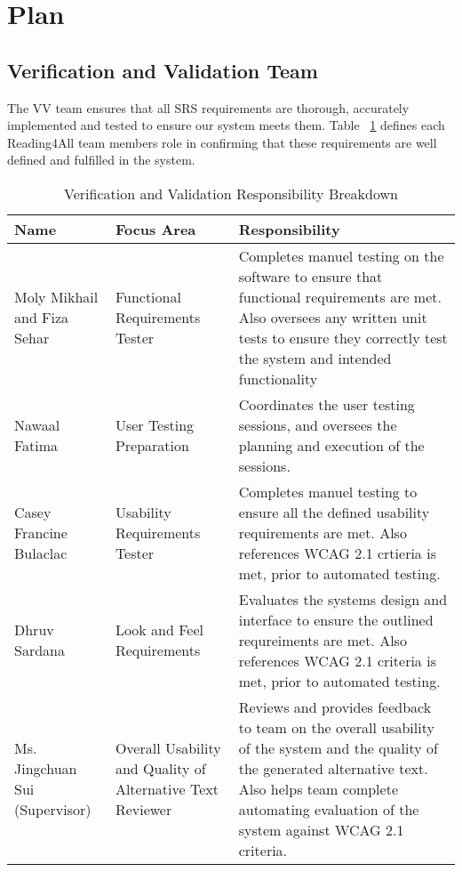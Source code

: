 \documentclass[12pt, titlepage]{article}
\begin{document}
\section{Plan}


\subsection{Verification and Validation Team}


The V\*V team ensures that all SRS requirements are thorough, accurately implemented and tested to ensure our system meets them. 
Table ~\ref{tab:data-dictionary-reading4all} defines each Reading4All team members role in confirming that these requirements are well defined and fulfilled in the system.

\begin{table}[H]
    \centering
    \caption{Verification and Validation Responsibility Breakdown}
    \label{tab:data-dictionary-reading4all}
    \begin{tabular}{ |p{3.0cm}|p{3.8cm}|p{7.3cm}| }
      \hline
      \textbf{Name} & \textbf{ Focus Area } & \textbf{Responsibility} \\
      \hline
      Moly Mikhail and Fiza Sehar & Functional Requirements Tester & Completes manuel testing on the software to ensure that functional requirements are met. Also oversees any written unit tests to ensure they correctly test the system and intended functionality \\
      \hline
      Nawaal Fatima & User Testing Preparation & Coordinates the user testing sessions, and oversees the planning and execution of the sessions. \\
      \hline 
      Casey Francine Bulaclac & Usability Requirements Tester & Completes manuel testing to ensure all the defined usability requirements are met. Also references WCAG 2.1 crtieria is met, prior to automated testing. \\
      \hline 
      Dhruv Sardana & Look and Feel Requirements & Evaluates the systems design and interface to ensure the outlined requreiments are met. Also references WCAG 2.1 criteria is met, prior to automated testing. \\
      \hline 
      Ms. Jingchuan Sui (Supervisor) & Overall Usability and Quality of Alternative Text Reviewer & Reviews and provides feedback to team on the overall usability of the system and the quality of the generated alternative text. Also helps team complete automating evaluation of the system against WCAG 2.1 criteria. \\ 
      \hline
    \end{tabular}
  \end{table}
  
\end{document}
